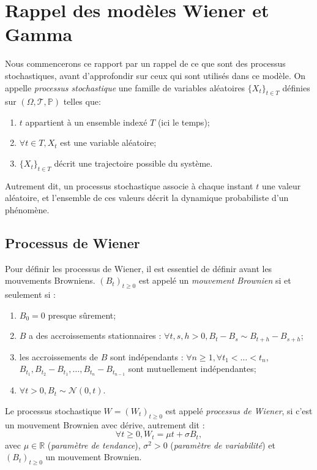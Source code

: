 \documentclass[11pt,a4paper]{article}
\begin{document}
\section{Rappel des modèles Wiener et Gamma} \label{rappels}
Nous commencerons ce rapport par un rappel de ce que sont des processus stochastiques, avant d'approfondir sur ceux qui sont utilisés dans ce modèle.
On appelle \textit{processus stochastique} une famille de variables aléatoires $\{X_t\}_{t \in T}$ définies sur $(\Omega, \mathcal{T}, \mathbb{P})$ telles que:
\begin{enumerate}
	\item $t$ appartient à un ensemble indexé $T$ (ici le temps);
	\item  $\forall t \in T, X_t$ est une variable aléatoire;
	\item $\{X_t\}_{t \in T}$ décrit une trajectoire possible du système.
\end{enumerate}
Autrement dit, un processus stochastique associe à chaque instant $t$ une valeur aléatoire, et l’ensemble de ces valeurs décrit la dynamique probabiliste d’un phénomène.

\subsection{Processus de Wiener} \label{rappels:wiener}
Pour définir les processus de Wiener, il est essentiel de définir avant les mouvements Browniens.
$(B_t)_{t \geq 0}$ est appelé un \textit{mouvement Brownien} si et seulement si :
\begin{enumerate}
	\item $B_0 = 0$ presque sûrement;
	\item $B$ a des accroissements stationnaires : $\forall t,s,h>0, B_t-B_s \sim B_{t+h}-B_{s+h}$;
	\item les accroissements de $B$ sont indépendants : $\forall n \geq 1, \forall t_1< \dots < t_n$, $B_{t_1},B_{t_2}-B_{t_1}, \dots, B_{t_n}-B_{t_{n-1}}$ sont mutuellement indépendantes;
	\item $\forall t>0, B_t \sim \mathcal{N}(0,t)$.
\end{enumerate}
Le processus stochastique $W=(W_t)_{t \geq 0}$ est appelé \textit{processus de Wiener}, si c'est un mouvement Brownien avec dérive, autrement dit : $$ \forall t \geq 0, W_t = \mu t + \sigma B_t,
$$ avec $\mu \in \mathbb{R}$ (\textit{paramètre de tendance}), $\sigma^2 > 0$ (\textit{paramètre de variabilité}) et  $(B_t)_{t \geq 0}$ un mouvement Brownien.
\end{document}
